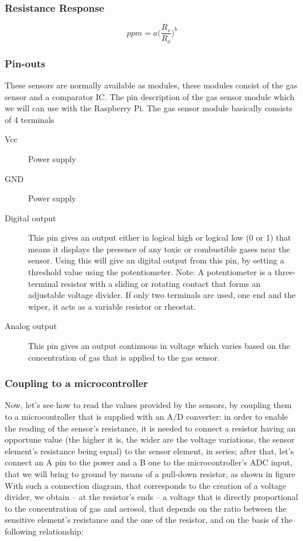 \documentclass{article}\usepackage[]{graphicx}\usepackage[]{color}
\begin{document}
\subsubsection{Resistance Response}

\begin{equation}
ppm = a\bigg( \frac{R_s}{R_o}\bigg)^b
\end{equation}

\subsubsection{Pin-outs}

These sensors are normally available as modules, these modules consist of the gas sensor and a comparator IC. The pin description of the gas sensor module which we will can use with the Raspberry Pi. The gas sensor module basically consists of 4 terminals

\begin{description}
  \item[Vcc] Power supply
  \item[GND] Power supply
  \item[Digital output] This pin gives an output either in logical high or logical low (0 or 1) that means it displays the presence of any toxic or combustible gases near the sensor. Using this will give an digital output from this pin, by setting a threshold value using the potentiometer. Note: A potentiometer is a three-terminal resistor with a sliding or rotating contact that forms an adjustable voltage divider. If only two terminals are used, one end and the wiper, it acts as a variable resistor or rheostat.
  \item[Analog output] This pin gives an output continuous in voltage which varies based on the concentration of gas that is applied to the gas sensor.
\end{description}


\subsubsection{Coupling to a microcontroller}
Now, let's see how to read the values provided by the sensors, by coupling them to a microcontroller that is supplied with an A/D converter: in order to enable the reading of the sensor's resistance, it is needed to connect a resistor having an opportune value (the higher it is, the wider are the voltage variations, the sensor element's resistance being equal) to the sensor element, in series; after that, let's connect an A pin to the power and a B one to the microcontroller's ADC input, that we will bring to ground by means of a pull-down resistor, as shown in figure With such a connection diagram, that corresponds to the creation of a voltage divider, we obtain – at the resistor's ends – a voltage that is directly proportional to the concentration of gas and aerosol, that depends on the ratio between the sensitive element's resistance and the one of the resistor, and on the basis of the following relationship:
\end{document}
